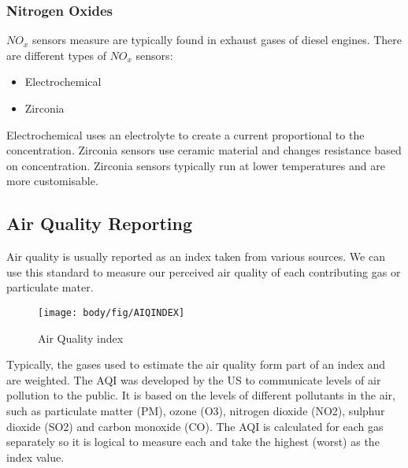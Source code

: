 \subsubsection{Nitrogen Oxides}
${NO_x}$ sensors measure are typically found in exhaust gases of diesel engines\cite{autolintec:noxsensor}. There are different types of ${NO_x}$ sensors\cite{drivearchive:noxsensor}:
\begin{itemize}
	\item Electrochemical
	\item Zirconia
\end{itemize}
Electrochemical uses an electrolyte to create a current proportional to the concentration.
Zirconia sensors use ceramic material and changes resistance based on concentration.
Zirconia sensors typically run at lower temperatures and are more customisable.\cite{miura2006electrochemical}

\pagebreak
\subsection{Air Quality Reporting}
Air quality is usually reported as an index taken from various sources. We can use this standard to measure our perceived air quality of each contributing gas or particulate mater. \cite{airqualit:index} 

\begin{figure}[!htb]
	\centering
	\texttt{[image: body/fig/AIQINDEX]}
	\caption{Air Quality index \cite{GreenEcon2}}
	\label{fig:index}
\end{figure}

\noindent
Typically, the gases used to estimate the air quality form part of an index and are weighted. The AQI was developed by the US to communicate levels of air pollution to the public\cite{Airly}.  It is based on the levels of different pollutants in the air, such as particulate matter (PM), ozone (O3), nitrogen dioxide (NO2), sulphur dioxide (SO2) and carbon monoxide (CO). The AQI is calculated for each gas separately so it is logical to measure each and take the highest (worst) as the index value.\cite{worldairqualityranking}






